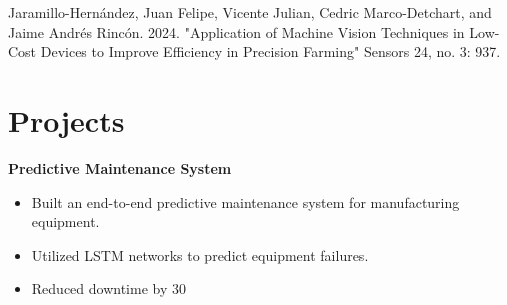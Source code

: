%
%
%


\begin{scholarship}
					{Jaramillo-Hernández, Juan Felipe, Vicente Julian, Cedric Marco-Detchart, and Jaime Andrés Rincón. 2024. "Application of Machine Vision Techniques in Low-Cost Devices to Improve Efficiency in Precision Farming" Sensors 24, no. 3: 937. \href{https://doi.org/10.3390/s24030937}{\color{CadetBlue}{https://doi.org/10.3390/s24030937}}}
\end{scholarship}



\section*{Projects}
\textbf{Predictive Maintenance System}
\begin{itemize}
    \item Built an end-to-end predictive maintenance system for manufacturing equipment.
    \item Utilized LSTM networks to predict equipment failures.
    \item Reduced downtime by 30%
\end{itemize}

